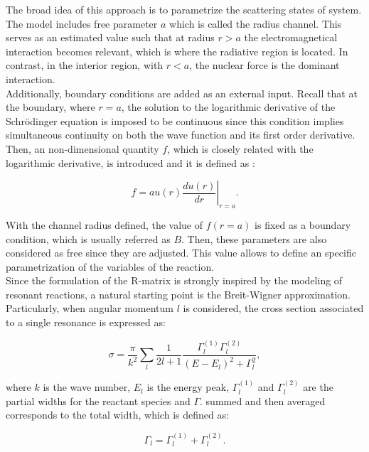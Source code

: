 \documentclass[openany]{book}
\begin{document}
The broad idea of this approach is to parametrize the scattering states of system.  The model includes free parameter $a$ which is called the radius channel. This serves as an estimated value such that at radius $r > a$ the electromagnetical interaction becomes relevant, which is where the radiative region is located. In contrast, in the interior region, with $r < a$, the nuclear force is the dominant interaction. \\

Additionally, boundary conditions are added as an external input. Recall that at the boundary, where $r = a$, the solution to the logarithmic derivative of the Schrödinger equation is imposed to be continuous since this condition implies simultaneous continuity on both the wave function and its first order derivative. Then, an non-dimensional quantity $f$, which is closely related with the logarithmic derivative, is introduced and it is defined as \cite{iliadis_2015}:

\begin{equation}\label{eq:rmatrix_f}
	f = a\left.u(r) \frac{du(r)}{dr}\right|_{r = a}.
\end{equation}

With the channel radius defined, the value of $f(r = a)$ is fixed as a boundary condition, which is usually referred as $B$.  Then, these parameters are also considered as free since they are adjusted. This value allows to define an specific parametrization of the variables of the reaction. \\

Since the formulation of the R-matrix is strongly inspired by the modeling of resonant reactions, a natural starting point is the Breit-Wigner approximation. Particularly, when angular momentum $l$ is considered, the cross section associated to a single resonance is expressed as:

\begin{equation}  \label{eq:rmatrix_breitWigner}
	\sigma = \frac{\pi}{k^2} \sum_{l} \frac{1}{2l + 1} \frac{\Gamma^{(1)}_{l} \Gamma^{(2)}_{l} }{(E - E_l)^2  + \Gamma^2_l }, 
\end{equation}

where $k$ is the wave number, $E_l$ is the energy peak,  $\Gamma^{(1)}_{l}$ and $\Gamma^{(2)}_{l}$ are the partial widths for the reactant species and $\Gamma$. summed and then averaged corresponds to the total width, which is defined as: 

\begin{equation}  \label{eq:rmatrix_totalWidth}
	\Gamma_l = \Gamma^{(1)}_{l} + \Gamma^{(2)}_{l}. 
\end{equation}
\end{document}

